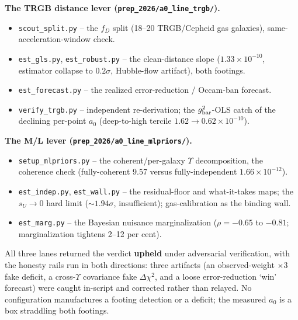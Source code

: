 \documentclass[fleqn,usenatbib]{mnras}
\begin{document}
\textbf{The TRGB distance lever (\texttt{prep\_2026/a0\_line\_trgb/}).}
\begin{itemize}
\item \texttt{scout\_split.py} -- the $f_D$ split (18--20 TRGB/Cepheid gas galaxies), same-acceleration-window check.
\item \texttt{est\_gls.py}, \texttt{est\_robust.py} -- the clean-distance slope ($1.33\times10^{-10}$, estimator collapse to $0.2\sigma$, Hubble-flow artifact), both footings.
\item \texttt{est\_forecast.py} -- the realized error-reduction / Occam-ban forecast.
\item \texttt{verify\_trgb.py} -- independent re-derivation; the $g_{\rm bar}^2$-OLS catch of the declining per-point $a_0$ (deep-to-high tercile $1.62\to0.62\times10^{-10}$).
\end{itemize}

\textbf{The M/L lever (\texttt{prep\_2026/a0\_line\_mlpriors/}).}
\begin{itemize}
\item \texttt{setup\_mlpriors.py} -- the coherent/per-galaxy $\Upsilon$ decomposition, the coherence check (fully-coherent 9.57 versus fully-independent $1.66\times10^{-12}$).
\item \texttt{est\_indep.py}, \texttt{est\_wall.py} -- the residual-floor and what-it-takes maps; the $s_U\to0$ hard limit (${\sim}1.94\sigma$, insufficient); gas-calibration as the binding wall.
\item \texttt{est\_marg.py} -- the Bayesian nuisance marginalization ($\rho=-0.65$ to $-0.81$; marginalization tightens 2--12 per cent).
\end{itemize}

All three lanes returned the verdict \textbf{upheld} under adversarial verification, with the honesty rails run in both directions: three artifacts (an observed-weight $\times3$ fake deficit, a cross-$\Upsilon$ covariance fake $\Delta\chi^2$, and a loose error-reduction `win' forecast) were caught in-script and corrected rather than relayed. No configuration manufactures a footing detection or a deficit; the measured $a_0$ is a box straddling both footings.

\bsp	%
\label{lastpage}
\end{document}
